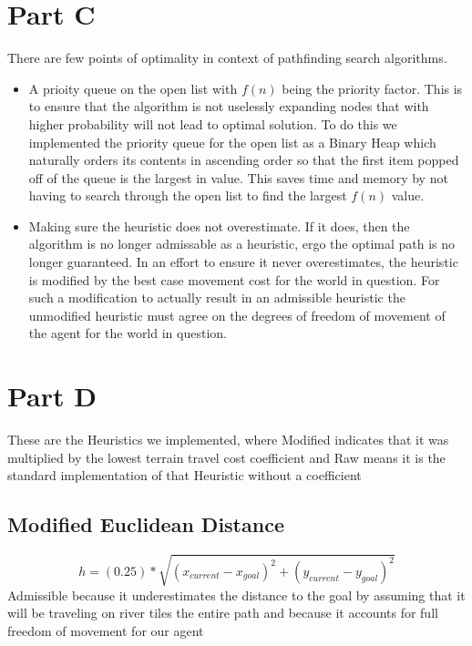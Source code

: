 \documentclass[12pt]{article}
\begin{document}
\section{Part C}
There are few points of optimality in context of pathfinding search algorithms.
\begin{itemize}
  \item A prioity queue on the open list with \(f(n)\) being the priority factor. This is to ensure that the algorithm is not uselessly expanding nodes that with higher probability will not lead to optimal solution. To do this we implemented the priority queue for the open list as a Binary Heap which naturally orders its contents in ascending order so that the first item popped off of the queue is the largest in value. This saves time and memory by not having to search through the open list to find the largest \(f(n)\) value.
  \item Making sure the heuristic does not overestimate. If it does, then the algorithm is no longer admissable as a heuristic, ergo the optimal path is no longer guaranteed. In an effort to ensure it never overestimates, the heuristic is modified by the best case movement cost for the world in question. For such a modification to actually result in an admissible heuristic the unmodified heuristic must agree on the degrees of freedom of movement of the agent for the world in question. 
\end{itemize}


\section{Part D}
These are the Heuristics we implemented, where Modified indicates that it was multiplied by the lowest terrain travel cost coefficient and Raw means it is the standard implementation of that Heuristic without a coefficient
\subsection{Modified Euclidean Distance}
 \[ h = (0.25) * \sqrt{ (x_{current} - x_{goal})^2 + (y_{current} - y_{goal})^2}\]
\newline
 Admissible because it underestimates the distance to the goal by assuming that it will be traveling on river tiles the entire path and because it accounts for full freedom of movement for our agent
\end{document}
